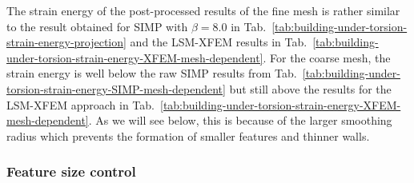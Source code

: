 %
The strain energy of the post-processed results of the fine mesh is rather similar to the result obtained for SIMP with $\beta=8.0$ in Tab.~\ref{tab:building-under-torsion-strain-energy-projection} and the LSM-XFEM results in Tab.~\ref{tab:building-under-torsion-strain-energy-XFEM-mesh-dependent}. For the coarse mesh, the strain energy is well below the raw SIMP results from Tab.~\ref{tab:building-under-torsion-strain-energy-SIMP-mesh-dependent} but still above the results for the LSM-XFEM approach in Tab.~\ref{tab:building-under-torsion-strain-energy-XFEM-mesh-dependent}. As we will see below, this is because of the larger smoothing radius which prevents the formation of smaller features and thinner walls.


\subsubsection{Feature size control}
\label{sec:feature-size-control}

